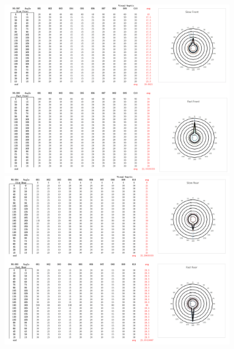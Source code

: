 \begin{figure}[h]
\centering
\includegraphics[width=0.9\textwidth,height=0.36\textheight]{A_thesis/appendix/Exp1_1-09.png}
\break
\break
\includegraphics[width=0.9\textwidth,height=0.36\textheight]{A_thesis/appendix/Exp1_1-10.png}
\end{figure}
\newpage

